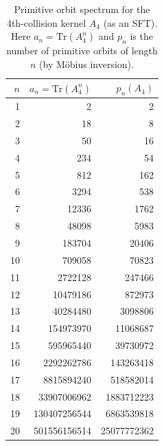 \begin{table}[H]
\centering
\scriptsize
\setlength{\tabcolsep}{6pt}
\caption{Primitive orbit spectrum for the 4th-collision kernel $A_4$ (as an SFT). Here $a_n=\mathrm{Tr}(A_4^n)$ and $p_n$ is the number of primitive orbits of length $n$ (by M\"obius inversion).}
\label{tab:collision_kernel_A4_primitive}
\begin{tabular}{r r r}
\toprule
$n$ & $a_n=\mathrm{Tr}(A_4^n)$ & $p_n(A_4)$\\
\midrule
1 & 2 & 2\\
2 & 18 & 8\\
3 & 50 & 16\\
4 & 234 & 54\\
5 & 812 & 162\\
6 & 3294 & 538\\
7 & 12336 & 1762\\
8 & 48098 & 5983\\
9 & 183704 & 20406\\
10 & 709058 & 70823\\
11 & 2722128 & 247466\\
12 & 10479186 & 872973\\
13 & 40284480 & 3098806\\
14 & 154973970 & 11068687\\
15 & 595965440 & 39730972\\
16 & 2292262786 & 143263418\\
17 & 8815894240 & 518582014\\
18 & 33907006962 & 1883712223\\
19 & 130407256544 & 6863539818\\
20 & 501556156514 & 25077772362\\
\bottomrule
\end{tabular}
\end{table}
